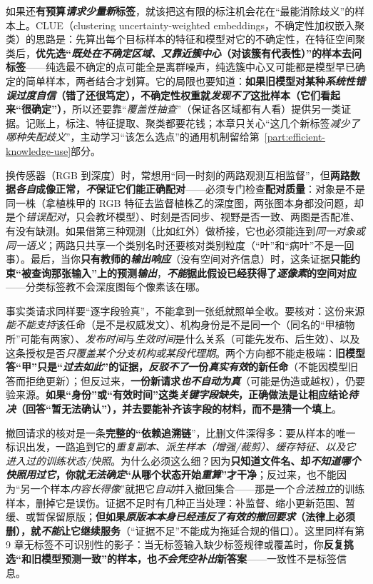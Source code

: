 如果还\textbf{有预算\emph{请求少量\emph{新}}标签}，就该把这有限的标注机会花在“最能消除歧义”的样本上。CLUE（clustering uncertainty-weighted embeddings，不确定性加权嵌入聚类）的思路是：先算出每个目标样本的特征和模型对它的不确定性，在特征空间聚类后，\textbf{优先选“\emph{既处在不确定区域、又\emph{靠近簇中心}}（对该簇有代表性）”的样本去问标签}——纯选最不确定的点可能全是离群噪声，纯选簇中心又可能都是模型早已确定的简单样本，两者结合才划算。它的局限也要知道：\textbf{如果旧模型对某种\emph{系统性错误}\emph{过度自信}（错了还很笃定），不确定性权重就\emph{发现不了}这批样本（它们看起来“很确定”）}，所以还要靠“\emph{覆盖性抽查}”（保证各区域都有人看）提供另一类证据。记账上，标注、特征提取、聚类都要花钱；本章只关心“这几个新标签\emph{减少了哪种失配歧义}”，主动学习“该怎么选点”的通用机制留给第~\ref{part:efficient-knowledge-use}部分。

换传感器（RGB 到深度）时，常想用“同一时刻的两路观测互相监督”，但\textbf{两路数据\emph{各自}成像正常，\emph{不}保证它们能正确配对}——必须专门检查\textbf{配对质量}：对象是不是同一株（拿植株甲的 RGB 特征去监督植株乙的深度图，两张图本身都没问题，却是个\emph{错误配对}，只会教坏模型）、时刻是否同步、视野是否一致、两图是否配准、有没有缺测。如果借第三种观测（比如红外）做桥接，它也必须能连到\emph{同一对象或同一语义}；两路只共享一个类别名时还要核对类别粒度（“叶”和“病叶”不是一回事）。最后，当你\textbf{只有教师的\emph{输出响应}}（没有空间对齐信息）时，这条证据\textbf{只能约束“被查询那张输入”上的预测\emph{输出}}，\textbf{\emph{不能}据此假设已经获得了\emph{逐像素}的空间对应}——分类标签教不会深度图每个像素该在哪。

事实类请求同样要“逐字段验真”，不能拿到一张纸就照单全收。要核对：这份来源\emph{能不能支持}该任命（是不是权威发文）、机构身份是不是同一个（同名的“甲植物所”可能有两家）、\emph{发布时间}与\emph{生效时间}是什么关系（可能先发布、后生效）、以及这条授权是否\emph{只覆盖某个分支机构或某段代理期}。两个方向都不能走极端：\textbf{旧模型答“甲”只是“\emph{过去如此}”的证据，\emph{反驳不了}一份\emph{真实有效}的新任命}（不能因模型旧答而拒绝更新）；但反过来，\textbf{一份新请求\emph{也不自动为真}}（可能是伪造或越权），仍要验来源。\textbf{如果“身份”或“有效时间”这类\emph{关键字段缺失}，正确做法是让相应结论\emph{待决}（回答“暂无法确认”），并去要能补齐该字段的材料，而不是猜一个填上}。

撤回请求的核对是一条\textbf{完整的“依赖追溯链}”，比删文件深得多：要从样本的唯一标识出发，一路追到它的\emph{重复副本、派生样本（增强/裁剪）、缓存特征、以及它进入过的训练状态/快照}。为什么必须这么细？因为\textbf{只知道文件名、却\emph{不知道哪个快照用过它}，你就\emph{无法确定}“从哪个状态开始\emph{重算}”才干净}；反过来，也不能因为“另一个样本\emph{内容长得像}”就把它\emph{自动}并入撤回集合——那是一个\emph{合法独立}的训练样本，删掉它是误伤。证据不足时有几种正当处理：补监督、缩小更新范围、暂缓、或暂保留原版；\textbf{但如果\emph{原版本本身已经违反了有效的撤回要求}（法律上必须删），就\emph{不能}让它继续服务}（“证据不足”不能成为拖延合规的借口）。这里同样有第 9 章无标签不可识别性的影子：当无标签输入缺少标签规律或覆盖时，你\textbf{反复挑选“和旧模型预测一致”的样本，也\emph{不会凭空补出}新答案}——一致性不是标签信息。

